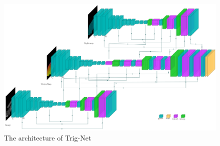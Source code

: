 \documentclass[border=15pt, multi, tikz]{article}
\begin{document}
\begin{figure}
	\centering
	\includegraphics[width=1\textwidth]{Figures/trignet} %
	\caption{The architecture of Trig-Net}
	\label{fig:Trig-Net}
\end{figure}
\end{document}
